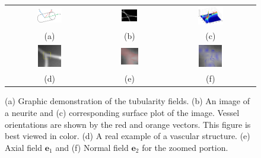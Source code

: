 \begin{figure}[t]
\centering
\begin{tabular}{ccc}
\includegraphics[width=0.3\textwidth]{images/ch2/3dvessel}	&
\includegraphics[width=0.25\textwidth]{images/ch2/vessel}	&
\includegraphics[width=0.3\textwidth]{images/ch2/vessel_mesh} \\
\scriptsize(a) & \scriptsize(b) & \scriptsize(c) \\
\includegraphics[width=0.28\textwidth]{images/ch2/orig}	&
\includegraphics[width=0.28\textwidth]{images/ch2/F1}	&
\includegraphics[width=0.28\textwidth]{images/ch2/F2} \\
\scriptsize(d) & \scriptsize(e) & \scriptsize(f) \\
\end{tabular}
\caption[Tubularity field]{(a) Graphic demonstration of the tubularity fields. (b) An image of a neurite and (c) corresponding surface plot of the image. Vessel orientations are shown by the red and orange vectors. This figure is best viewed in color. (d) A real example of a vascular structure. (e) Axial field $\textbf{e}_1$ and (f) Normal field $\textbf{e}_2$ for the zoomed portion.}
\label{fig:frangi_vessel}
\end{figure}
